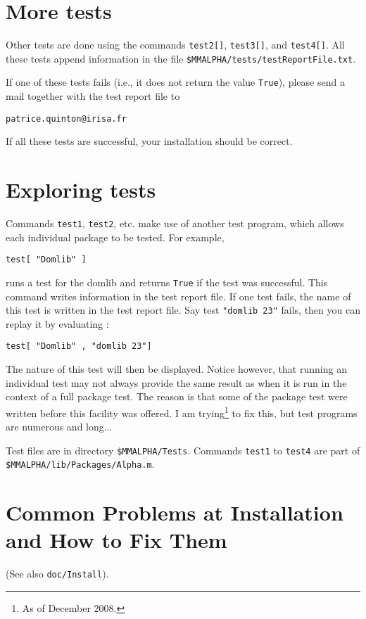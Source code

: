 \documentclass[12pt]{article}
\begin{document}
\section{More tests}
Other tests are done using the commands 
\texttt{test2[]}, 
\texttt{test3[]}, 
and \texttt{test4[]}. All these tests append information in the 
file \texttt{\$MMALPHA/tests/testReportFile.txt}. 

If one of these tests fails (i.e., it does not return the value \texttt{True}),
please send a mail together
with the test report file to 
\begin{verbatim}
patrice.quinton@irisa.fr
\end{verbatim}

If all these tests are successful, your installation should be correct.

\section{Exploring tests}
Commands \texttt{test1}, \texttt{test2}, etc. make use of another test program, 
which allows each individual package to be tested. For example, 
\begin{verbatim}
test[ "Domlib" ]
\end{verbatim}
runs a test for the domlib and returns \texttt{True} if the test was successful. This 
command writes information in the test report file. If one test fails, the name
of this test is written in the test report file. Say test \texttt{"domlib 23"} fails, then 
you can replay it by evaluating : 
\begin{verbatim}
test[ "Domlib" , "domlib 23"]
\end{verbatim}
The nature of this test will then be displayed. 
Notice however, that running an individual test may not always provide the
same result as when it is run in the context of a full package test. The reason is that
some of the package test were written before this facility was offered. I am trying\footnote{As of December 2008.}
to fix this, but test programs are numerous and long...

Test files are in directory \texttt{\$MMALPHA/Tests}. Commands \texttt{test1} to
\texttt{test4} are part of \texttt{\$MMALPHA/lib/Packages/Alpha.m}.

\section{Common Problems at Installation and How to Fix Them}
(See also \texttt{doc/Install}).
\end{document}
